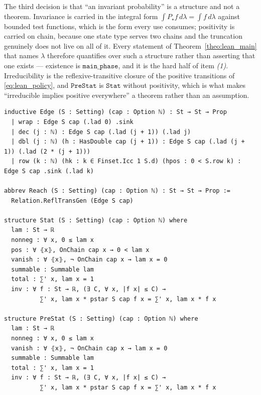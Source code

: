 The third decision is that ``an invariant probability'' is a structure and not a theorem.
Invariance is carried in the integral form $\int P_\star f\,d\lambda=\int f\,d\lambda$ against
bounded test functions, which is the form every use consumes; positivity is carried on chain,
because one state type serves two chains and the truncation genuinely does not live on all of
it. Every statement of Theorem~\ref{theo:lean_main} that names $\lambda$ therefore quantifies
over such a structure rather than asserting that one exists --- existence is
$\texttt{main\_phase}$, and it is the hard half of item \emph{(1)}. Irreducibility is the
reflexive-transitive closure of the positive transitions of \eqref{eq:lean_policy}, and
$\texttt{PreStat}$ is $\texttt{Stat}$ without positivity, which is what makes ``irreducible
implies positive everywhere'' a theorem rather than an assumption.
\begin{lstlisting}[style=lean]
inductive Edge (S : Setting) (cap : Option ℕ) : St → St → Prop
  | wrap : Edge S cap (.lad 0) .sink
  | dec (j : ℕ) : Edge S cap (.lad (j + 1)) (.lad j)
  | dbl (j : ℕ) (h : HasDouble cap (j + 1)) : Edge S cap (.lad (j + 1)) (.lad (2 * (j + 1)))
  | row (k : ℕ) (hk : k ∈ Finset.Icc 1 S.d) (hpos : 0 < S.row k) : Edge S cap .sink (.lad k)

abbrev Reach (S : Setting) (cap : Option ℕ) : St → St → Prop :=
  Relation.ReflTransGen (Edge S cap)

structure Stat (S : Setting) (cap : Option ℕ) where
  lam : St → ℝ
  nonneg : ∀ x, 0 ≤ lam x
  pos : ∀ ⦃x⦄, OnChain cap x → 0 < lam x
  vanish : ∀ ⦃x⦄, ¬ OnChain cap x → lam x = 0
  summable : Summable lam
  total : ∑' x, lam x = 1
  inv : ∀ f : St → ℝ, (∃ C, ∀ x, |f x| ≤ C) →
          ∑' x, lam x * pstar S cap f x = ∑' x, lam x * f x

structure PreStat (S : Setting) (cap : Option ℕ) where
  lam : St → ℝ
  nonneg : ∀ x, 0 ≤ lam x
  vanish : ∀ ⦃x⦄, ¬ OnChain cap x → lam x = 0
  summable : Summable lam
  total : ∑' x, lam x = 1
  inv : ∀ f : St → ℝ, (∃ C, ∀ x, |f x| ≤ C) →
          ∑' x, lam x * pstar S cap f x = ∑' x, lam x * f x
\end{lstlisting}

